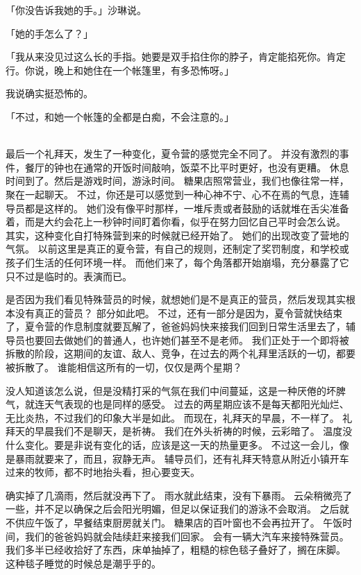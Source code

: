 \documentclass[UTF8]{ctexart}
\begin{document}
「你没告诉我她的手。」沙琳说。

「她的手怎么了？」

「我从来没见过这么长的手指。她要是双手掐住你的脖子，肯定能掐死你。肯定行。你说，晚上和她住在一个帐篷里，有多恐怖呀。」

我说确实挺恐怖的。

「不过，和她一个帐篷的全都是白痴，不会注意的。」

~\\

最后一个礼拜天，发生了一种变化，夏令营的感觉完全不同了。
并没有激烈的事件，餐厅的钟也在通常的开饭时间敲响，饭菜不比平时更好，也没有更糟。
休息时间到了。然后是游戏时间，游泳时间。
糖果店照常营业，我们也像往常一样，聚在一起聊天。
不过，你还是可以感觉到一种心神不宁、心不在焉的气息，连辅导员都是这样的。
她们没有像平时那样，一堆斥责或者鼓励的话就堆在舌尖准备着，而是大约会花上一秒钟时间盯着你看，似乎在努力回忆自己平时会怎么说。
其实，这种变化自打特殊营到来的时候就已经开始了。
她们的出现改变了营地的气氛。
以前这里是真正的夏令营，有自己的规则，还制定了奖罚制度，和学校或孩子们生活的任何环境一样。
而他们来了，每个角落都开始崩塌，充分暴露了它只不过是临时的。表演而已。

是否因为我们看见特殊营员的时候，就想她们是不是真正的营员，然后发现其实根本没有真正的营员？
部分如此吧。
不过，还有一部分是因为，夏令营就快结束了，夏令营的作息制度就要瓦解了，爸爸妈妈快来接我们回到日常生活里去了，辅导员也要回去做她们的普通人，也许她们甚至不是老师。
我们正处于一个即将被拆散的阶段，这期间的友谊、敌人、竞争，在过去的两个礼拜里活跃的一切，都要被拆散了。
谁能相信这所有的一切，仅仅是两个星期？

没人知道该怎么说，但是没精打采的气氛在我们中间蔓延，这是一种厌倦的坏脾气，就连天气表现的也是同样的感受。
过去的两星期应该不是每天都阳光灿烂、无比炎热，不过我们的印象大半是如此。
而现在，礼拜天的早晨，不一样了。
礼拜天的早晨我们不是聊天，是祈祷。
我们在外头祈祷的时候，云彩暗了。
温度没什么变化。要是非说有变化的话，应该是这一天的热量更多。
不过这一会儿，像是暴雨就要来了，而且，寂静无声。
辅导员们，还有礼拜天特意从附近小镇开车过来的牧师，都不时地抬头看，担心要变天。

确实掉了几滴雨，然后就没再下了。
雨水就此结束，没有下暴雨。
云朵稍微亮了一些，并不足以确保之后会阳光明媚，但足以保证我们的游泳不会取消。
之后就不供应午饭了，早餐结束厨房就关门。
糖果店的百叶窗也不会再拉开了。
午饭时间，我们的爸爸妈妈就会陆续赶来接我们回家。
会有一辆大汽车来接特殊营员。
我们多半已经收拾好了东西，床单抽掉了，粗糙的棕色毯子叠好了，搁在床脚。
这种毯子睡觉的时候总是潮乎乎的。
\end{document}
